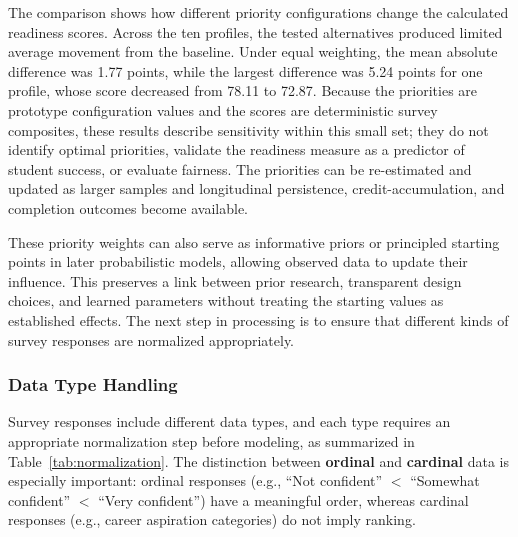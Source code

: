\documentclass[letterpaper,11pt]{article}
\begin{document}
The comparison shows how different priority configurations change the calculated readiness scores. Across the ten profiles, the tested alternatives produced limited average movement from the baseline. Under equal weighting, the mean absolute difference was 1.77 points, while the largest difference was 5.24 points for one profile, whose score decreased from 78.11 to 72.87. Because the priorities are prototype configuration values and the scores are deterministic survey composites, these results describe sensitivity within this small set; they do not identify optimal priorities, validate the readiness measure as a predictor of student success, or evaluate fairness. The priorities can be re-estimated and updated as larger samples and longitudinal persistence, credit-accumulation, and completion outcomes become available.

These priority weights can also serve as informative priors or principled starting points in later probabilistic models, allowing observed data to update their influence. This preserves a link between prior research, transparent design choices, and learned parameters without treating the starting values as established effects. The next step in processing is to ensure that different kinds of survey responses are normalized appropriately.

\subsubsection{Data Type Handling}

Survey responses include different data types, and each type requires an appropriate normalization step before modeling, as summarized in Table~\ref{tab:normalization}. The distinction between \textbf{ordinal} and \textbf{cardinal} data is especially important: ordinal responses (e.g., ``Not confident'' $<$ ``Somewhat confident'' $<$ ``Very confident'') have a meaningful order, whereas cardinal responses (e.g., career aspiration categories) do not imply ranking.
\end{document}
